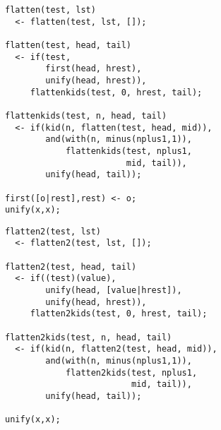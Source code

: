

\begin{verbatim}
flatten(test, lst)
  <- flatten(test, lst, []);

flatten(test, head, tail)
  <- if(test,
        first(head, hrest),
        unify(head, hrest)),
     flattenkids(test, 0, hrest, tail);

flattenkids(test, n, head, tail)
  <- if(kid(n, flatten(test, head, mid)),
        and(with(n, minus(nplus1,1)),
            flattenkids(test, nplus1,
                        mid, tail)),
        unify(head, tail));

first([o|rest],rest) <- o;
unify(x,x);
\end{verbatim}


\begin{verbatim}
flatten2(test, lst)
  <- flatten2(test, lst, []);

flatten2(test, head, tail)
  <- if((test)(value),
        unify(head, [value|hrest]),
        unify(head, hrest)),
     flatten2kids(test, 0, hrest, tail);

flatten2kids(test, n, head, tail)
  <- if(kid(n, flatten2(test, head, mid)),
        and(with(n, minus(nplus1,1)),
            flatten2kids(test, nplus1,
                         mid, tail)),
        unify(head, tail));

unify(x,x);
\end{verbatim}



\secup

\secrel{}\secdown
{}\label{crew31}
\secup

\secup